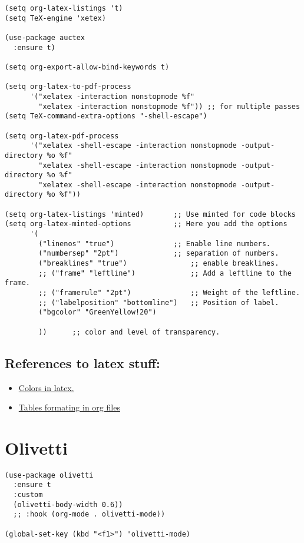 \documentclass[11pt]{article}
\begin{document}
\begin{verbatim}
(setq org-latex-listings 't)
(setq TeX-engine 'xetex)

(use-package auctex
  :ensure t)

(setq org-export-allow-bind-keywords t)

(setq org-latex-to-pdf-process 
      '("xelatex -interaction nonstopmode %f"
        "xelatex -interaction nonstopmode %f")) ;; for multiple passes
(setq TeX-command-extra-options "-shell-escape")

(setq org-latex-pdf-process
      '("xelatex -shell-escape -interaction nonstopmode -output-directory %o %f"
        "xelatex -shell-escape -interaction nonstopmode -output-directory %o %f"
        "xelatex -shell-escape -interaction nonstopmode -output-directory %o %f"))

(setq org-latex-listings 'minted) 		;; Use minted for code blocks
(setq org-latex-minted-options 			;; Here you add the options 
      '(
        ("linenos" "true")				;; Enable line numbers.
        ("numbersep" "2pt")				;; separation of numbers.
        ("breaklines" "true")				;; enable breaklines.
        ;; ("frame" "leftline")				;; Add a leftline to the frame.
        ;; ("framerule" "2pt")				;; Weight of the leftline.
        ;; ("labelposition" "bottomline")	;; Position of label.
        ("bgcolor" "GreenYellow!20")

        ))		;; color and level of transparency.
\end{verbatim}
\subsection{References to latex stuff:}
\label{sec:orgc0f55bf}
\begin{itemize}
\item \href{https://www.overleaf.com/learn/latex/Using\_colors\_in\_LaTeX}{Colors in latex.}
\item \href{https://orgmode.org/manual/Tables-in-LaTeX-export.html}{Tables formating in org files}
\end{itemize}
\section{Olivetti}
\label{sec:orgddfdfd0}
\begin{verbatim}
(use-package olivetti
  :ensure t
  :custom
  (olivetti-body-width 0.6))
  ;; :hook (org-mode . olivetti-mode))

(global-set-key (kbd "<f1>") 'olivetti-mode)
\end{verbatim}
\end{document}
